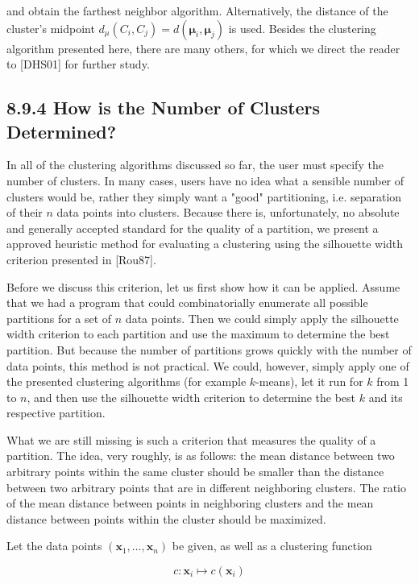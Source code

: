 \documentclass[10pt]{article}
\begin{document}
and obtain the farthest neighbor algorithm. Alternatively, the distance of the cluster's midpoint $d_{\mu}\left(C_{i}, C_{j}\right)=d\left(\boldsymbol{\mu}_{i}, \boldsymbol{\mu}_{j}\right)$ is used. Besides the clustering algorithm presented here, there are many others, for which we direct the reader to [DHS01] for further study.

\subsection*{8.9.4 How is the Number of Clusters Determined?}
In all of the clustering algorithms discussed so far, the user must specify the number of clusters. In many cases, users have no idea what a sensible number of clusters would be, rather they simply want a "good" partitioning, i.e. separation of their $n$ data points into clusters. Because there is, unfortunately, no absolute and generally accepted standard for the quality of a partition, we present a approved heuristic method for evaluating a clustering using the silhouette width criterion presented in [Rou87].

Before we discuss this criterion, let us first show how it can be applied. Assume that we had a program that could combinatorially enumerate all possible partitions for a set of $n$ data points. Then we could simply apply the silhouette width criterion to each partition and use the maximum to determine the best partition. But because the number of partitions grows quickly with the number of data points, this method is not practical. We could, however, simply apply one of the presented clustering algorithms (for example $k$-means), let it run for $k$ from 1 to $n$, and then use the silhouette width criterion to determine the best $k$ and its respective partition.

What we are still missing is such a criterion that measures the quality of a partition. The idea, very roughly, is as follows: the mean distance between two arbitrary points within the same cluster should be smaller than the distance between two arbitrary points that are in different neighboring clusters. The ratio of the mean distance between points in neighboring clusters and the mean distance between points within the cluster should be maximized.

Let the data points $\left(\boldsymbol{x}_{1}, \ldots, \boldsymbol{x}_{n}\right)$ be given, as well as a clustering function

$$
c: \boldsymbol{x}_{i} \mapsto c\left(\boldsymbol{x}_{i}\right)
$$
\end{document}
